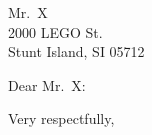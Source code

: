 \documentclass{letter}
\begin{document}
\begin{letter}{
Mr.~X \\
2000 LEGO St. \\
Stunt Island, SI 05712
}

\opening{Dear Mr.~X:}





\closing{Very respectfully,}

\end{letter}
\end{document}
